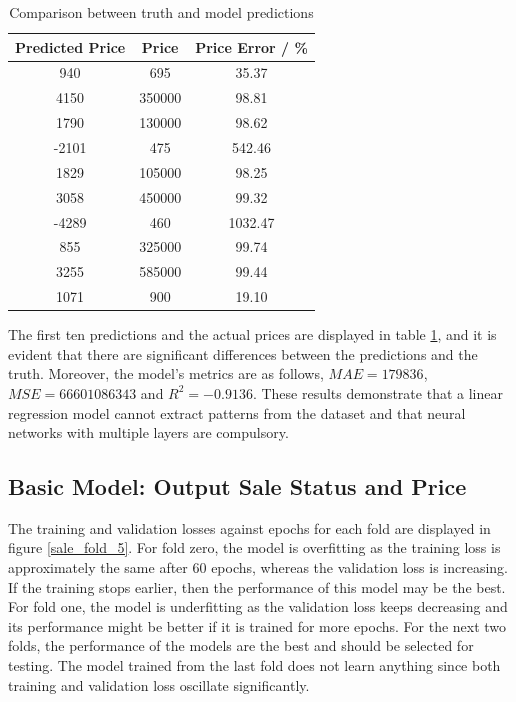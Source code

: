 \documentclass[12pt,twoside]{report}
\begin{document}
\begin{table}[!htbp]
	\centering
	\caption{Comparison between truth and model predictions}
	\label{linear_regression_predictions}
	\begin{tabular}{| c | c | c |}
		\hline
		Predicted Price & Price & Price Error  / \%\\ 
		\hline
		940 & 695 & 35.37 \\
		\hline
		4150 & 350000 & 98.81 \\
		\hline
		1790 & 130000 & 98.62 \\
		\hline
		-2101 & 475 & 542.46 \\
		\hline
		1829 & 105000 & 98.25 \\
		\hline
		3058 & 450000 & 99.32 \\
		\hline
		-4289 & 460 & 1032.47 \\
		\hline
		855 & 325000 & 99.74 \\
		\hline
		3255 & 585000 & 99.44 \\
		\hline
		1071 & 900 & 19.10 \\
		\hline
	\end{tabular}
\end{table}

The first ten predictions and the actual prices are displayed in table \ref{linear_regression_predictions}, and it is evident that there are significant differences between the predictions and the truth. Moreover, the model's metrics are as follows, $MAE = 179836$, $MSE = 66601086343$ and $R^2 = -0.9136$. These results demonstrate that a linear regression model cannot extract patterns from the dataset and that neural networks with multiple layers are compulsory.

\subsection{Basic Model: Output Sale Status and Price}
The training and validation losses against epochs for each fold are displayed in figure \ref{sale_fold_5}. For fold zero, the model is overfitting as the training loss is approximately the same after 60 epochs, whereas the validation loss is increasing. If the training stops earlier, then the performance of this model may be the best. For fold one, the model is underfitting as the validation loss keeps decreasing and its performance might be better if it is trained for more epochs. For the next two folds, the performance of the models are the best and should be selected for testing. The model trained from the last fold does not learn anything since both training and validation loss oscillate significantly. 
\\
\end{document}
